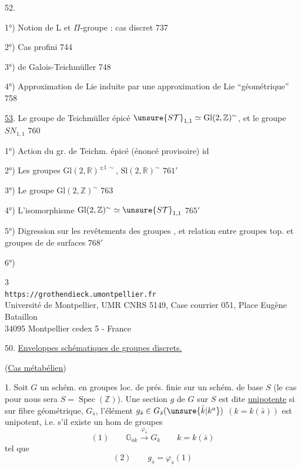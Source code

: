 52. 

1°) Notion de L et $\Pi$-groupe : cas discret \hfill 737

2°) Cas profini \hfill 744

3°)  de Galois-Teichmüller \hfill 748

4°) Approximation de Lie induite par une approximation de Lie ``géométrique'' \hfill 758

\uline{53}. Le groupe de Teichmüller épicé $\unsure{S\mathcal T}_{1,1}\simeq\mathrm{Gl}(2,\mathbb Z)^{\sim}$, et le groupe $SN_{1,1}$ \hfill 760

1°) Action  du gr. de Teichm. épicé (énoncé provisoire) \hfill id

2°) Les groupes $\mathrm{Gl}(2,\mathbb R)^{\pm1\,\sim}$, $\mathrm{Sl}(2,\mathbb R)^{\sim}$ \hfill $761'$

3°) Le groupe $\mathrm{Gl}(2,\mathbb Z)^{\sim}$ \hfill 763

4°) L'isomorphisme $\mathrm{Gl}(2,\mathbb Z)^{\sim}\simeq\unsure{S\mathcal T}_{1,1}$ \hfill $765'$

5°) Digression sur les revêtements des groupes , et relation entre groupes top. et groupes de  de surfaces \hfill $768'$

6°)


\begin{center}
\small
3\\
\texttt{https://grothendieck.umontpellier.fr}\\
Université de Montpellier, UMR CNRS 5149, Case courrier 051, Place Eugène Bataillon\\
34095 Montpellier cedex 5 - France
\end{center}


50. \uline{Enveloppes schématiques de groupes discrets.}

(\uline{Cas métabélien})

1. Soit $G$ un schém. en groupes loc. de prés. finie
sur un schém. de base $S$ (le cas  pour nous sera
$S=\operatorname{Spec}(\mathbb Z)$). Une section $g$ de $G$ sur $S$ est dite
\uline{unipotente} si sur  fibre géométrique,
 $G_{\bar s}$, l'élément
$g_{\bar s}\in G_{\bar s}(\unsure{\bar k|k^a})$
$(k=k(\bar s))$ est unipotent, i.e. s'il existe un hom de groupes
\[
(1)\qquad \mathbb G_{ak}\xrightarrow{\varphi_{\bar s}}G_k
\qquad k=k(\bar s)
\]
tel que
\[
(2)\qquad g_{\bar s}=\varphi_{\bar s}(1)
\]

